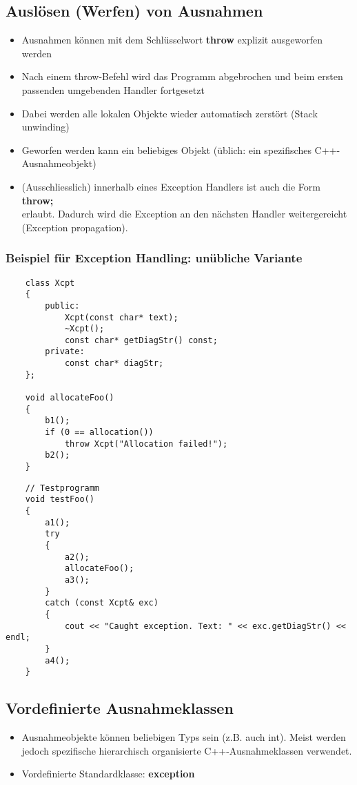 \subsection{Auslösen (Werfen) von Ausnahmen}
\label{sec:Ausloesen (Werfen) von Ausnahmen}
\begin{itemize}
	\item Ausnahmen können mit dem Schlüsselwort \textbf{throw} explizit ausgeworfen werden
	\item Nach einem throw-Befehl wird das Programm abgebrochen und beim ersten passenden umgebenden Handler fortgesetzt
	\item Dabei werden alle lokalen Objekte wieder automatisch zerstört (Stack unwinding)
	\item Geworfen werden kann ein beliebiges Objekt (üblich: ein spezifisches C++-Ausnahmeobjekt)
	\item (Ausschliesslich) innerhalb eines Exception Handlers ist auch die Form\\
	\textbf{throw;}\\
	erlaubt. Dadurch wird die Exception an den nächsten Handler weitergereicht (Exception propagation).
\end{itemize}

\subsubsection{Beispiel für Exception Handling: unübliche Variante}
\label{sec:Beispiel für Exception Handling: unuebliche Variante}
\noindent
\begin{minipage}{\linewidth}
	\begin{lstlisting}
	class Xcpt
	{
		public:
			Xcpt(const char* text);
			~Xcpt();
			const char* getDiagStr() const;
		private:
			const char* diagStr;
	};
	
	void allocateFoo()
	{
		b1();
		if (0 == allocation())
			throw Xcpt("Allocation failed!");
		b2();
	}
	\end{lstlisting}
\end{minipage}
\noindent
\begin{minipage}{\linewidth}
	\begin{lstlisting}
	// Testprogramm
	void testFoo()
	{
		a1();
		try
		{
			a2();
			allocateFoo();
			a3();
		}
		catch (const Xcpt& exc)
		{
			cout << "Caught exception. Text: " << exc.getDiagStr() << endl;
		}
		a4();
	}
	\end{lstlisting}
\end{minipage}

\subsection{Vordefinierte Ausnahmeklassen}
\label{sec:Vordefinierte Ausnahmeklassen}
\begin{itemize}
	\item Ausnahmeobjekte können beliebigen Typs sein (z.B. auch int). Meist werden jedoch spezifische hierarchisch organisierte C++-Ausnahmeklassen verwendet.
	\item Vordefinierte Standardklasse: \textbf{exception}
\end{itemize}

